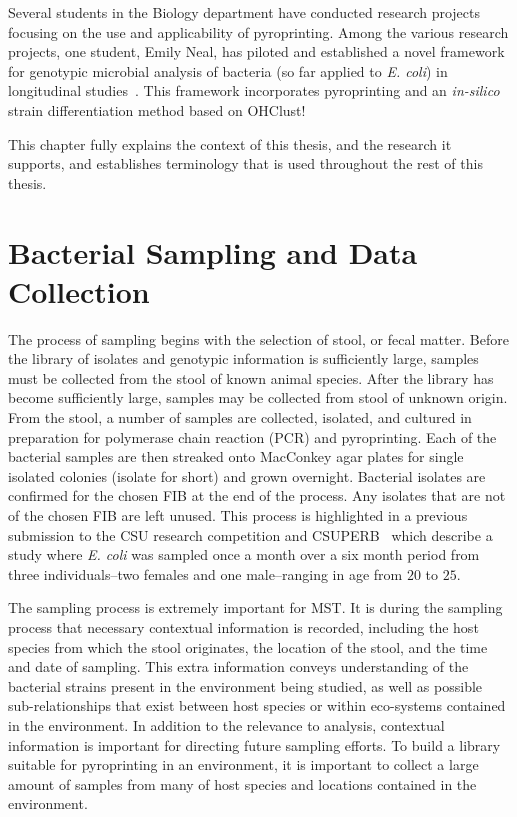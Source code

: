 \documentclass[12pt]{ucthesis}
\begin{document}
   Several students in the Biology department have conducted research projects
   focusing on the use and applicability of pyroprinting. Among the various
   research projects, one student, Emily Neal, has piloted and established a
   novel framework for genotypic microbial analysis of bacteria (so far applied
   to \textit{E. coli}) in longitudinal studies~\cite{Montana:ChronoCluster,
   Montana:CRC}. This framework incorporates pyroprinting and an
   \textit{in-silico} strain differentiation method based on
   \textsf{OHClust!}

   This chapter fully explains the context of this thesis, and the research it
   supports, and establishes terminology that is used throughout the rest of
   this thesis.

   \section{Bacterial Sampling and Data Collection}\label{sec:sampling}
      The process of sampling begins with the selection of stool, or fecal
      matter. Before the library of isolates and genotypic
      information is sufficiently large, samples must be collected from the
      stool of known animal species. After the library has become sufficiently
      large, samples may be collected from stool of unknown origin. From the
      stool, a number of samples are collected, isolated, and
      cultured in preparation for polymerase chain reaction (PCR) and
      pyroprinting. Each of the bacterial samples are then streaked onto
      MacConkey agar plates for single isolated colonies (isolate for short)
      and grown overnight. Bacterial isolates are confirmed for the chosen FIB
      at the end of the process. Any isolates that are not of the
      chosen FIB are left unused. This process is highlighted in a previous
      submission to the CSU research competition and CSUPERB~\cite{Montana:CRC,
      Emily:Demographics} which describe a study where \textit{E. coli} was
      sampled once a month over a six month period from three individuals--two
      females and one male--ranging in age from $20$ to $25$.

      The sampling process is extremely important for MST. It is during the
      sampling process that necessary contextual information is recorded,
      including the host species from which the stool originates, the location
      of the stool, and the time and date of sampling. This extra information
      conveys understanding of the bacterial strains present in the environment
      being studied, as well as possible sub-relationships that exist between
      host species or within eco-systems contained in the environment. In
      addition to the relevance to analysis, contextual information is
      important for directing future sampling efforts. To build a library
      suitable for pyroprinting in an environment, it is important to collect a
      large amount of samples from many of host species and locations contained
      in the environment.
\end{document}
